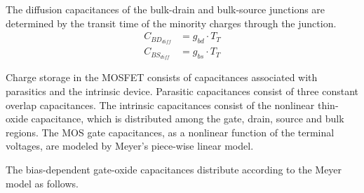 \documentclass[10pt]{report}
\begin{document}
The diffusion capacitances of the bulk-drain and bulk-source junctions
are determined by the transit time of the minority charges through the
junction.
\begin{align}
C_{BD_{diff}} &= g_{bd}\cdot T_T\\
C_{BS_{diff}} &= g_{bs}\cdot T_T
\end{align}

Charge storage in the MOSFET consists of capacitances associated with
parasitics and the intrinsic device.  Parasitic capacitances consist
of three constant overlap capacitances.  The intrinsic capacitances
consist of the nonlinear thin-oxide capacitance, which is distributed
among the gate, drain, source and bulk regions.  The MOS gate
capacitances, as a nonlinear function of the terminal voltages, are
modeled by Meyer's piece-wise linear model.

\addvspace{12pt}

The bias-dependent gate-oxide capacitances distribute according to the
Meyer model as follows.
\end{document}

